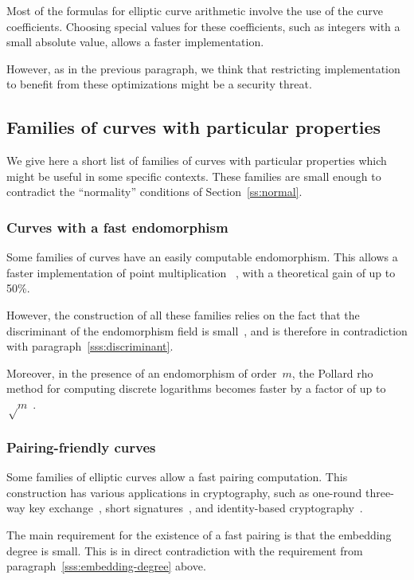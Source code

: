 \documentclass[twocolumn,letterpaper,10pt]{article}
\begin{document}
Most of the formulas for elliptic curve arithmetic
involve the use of the curve coefficients.
Choosing special values for these coefficients,
such as integers with a small absolute value,
allows a faster implementation.

However, as in the previous paragraph, we think that
restricting implementation to benefit from these optimizations
might be a security threat.

\subsection{Families of curves with particular properties}
\label{ss:particular}

We give here a short list of families of curves
with particular properties which might be useful in some specific contexts.
These families are small enough
to contradict the ``normality'' conditions of Section~\ref{ss:normal}.

\subsubsection{Curves with a fast endomorphism}

Some families of curves have an easily computable endomorphism.
This allows a faster implementation of point multiplication%
~\cite{crypto2001glv,jc2011gls}, with a theoretical gain of up to 50\%.

However, the construction of all these families
relies on the fact that the discriminant
of the endomorphism field is small~\cite{asia2013smith,corr2014smith},
and is therefore in contradiction with paragraph~\ref{sss:discriminant}.

Moreover, in the presence of an endomorphism of order~$m$,
the Pollard rho method for computing discrete logarithms
becomes faster by a factor of up to~$√m$~\cite{asia1999dgm,mc2000glv}.

\subsubsection{Pairing-friendly curves}
\label{sss:pairing}

Some families of elliptic curves allow a fast pairing computation.
This construction has various applications in cryptography,
such as one-round three-way key exchange~\cite{jc2004joux},
short signatures~\cite{jc2004bls},
and identity-based cryptography~\cite{crypto2001bf,el2002paterson,siam2003bf}.

The main requirement for the existence of a fast pairing
is that the embedding degree is small.
This is in direct contradiction with
the requirement from paragraph~\ref{sss:embedding-degree} above.
\end{document}
